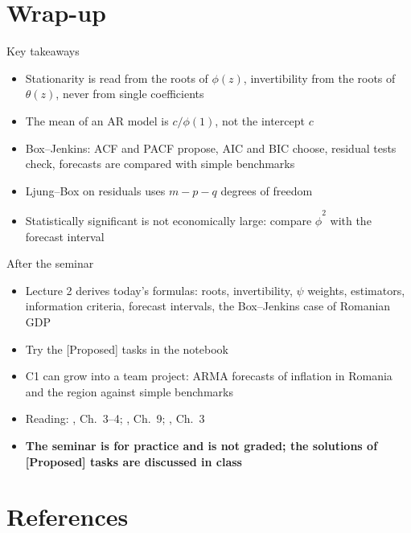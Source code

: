 \section{Wrap-up}

\begin{frame}{Key takeaways}
\itemsize{\small}
\begin{itemize}
    \item Stationarity is read from the roots of $\phi(z)$, invertibility from the roots of $\theta(z)$, never from single coefficients
    \item The mean of an AR model is $c/\phi(1)$, not the intercept $c$
    \item Box--Jenkins: ACF and PACF propose, AIC and BIC choose, residual tests check, forecasts are compared with simple benchmarks
    \item Ljung--Box on residuals uses $m - p - q$ degrees of freedom
    \item Statistically significant is not economically large: compare $\hat\phi^2$ with the forecast interval
\end{itemize}
\end{frame}

\begin{frame}{After the seminar}
\itemsize{\small}
\begin{itemize}
    \item Lecture 2 derives today's formulas: roots, invertibility, $\psi$ weights, estimators, information criteria, forecast intervals, the Box--Jenkins case of Romanian GDP
    \item Try the [Proposed] tasks in the notebook
    \item C1 can grow into a team project: ARMA forecasts of inflation in Romania and the region against simple benchmarks
    \item Reading: , Ch.~3--4; , Ch.~9; , Ch.~3
    \item \textbf{The seminar is for practice and is not graded; the solutions of [Proposed] tasks are discussed in class}
\end{itemize}
\end{frame}


\section{References}

